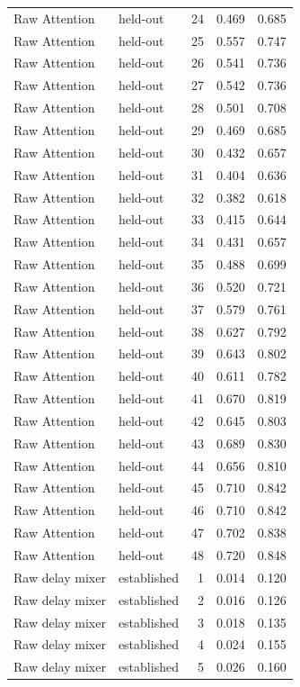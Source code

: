 \begin{tabular}{llrrr}
Raw Attention & held-out & 24 & 0.469 & 0.685 \\
Raw Attention & held-out & 25 & 0.557 & 0.747 \\
Raw Attention & held-out & 26 & 0.541 & 0.736 \\
Raw Attention & held-out & 27 & 0.542 & 0.736 \\
Raw Attention & held-out & 28 & 0.501 & 0.708 \\
Raw Attention & held-out & 29 & 0.469 & 0.685 \\
Raw Attention & held-out & 30 & 0.432 & 0.657 \\
Raw Attention & held-out & 31 & 0.404 & 0.636 \\
Raw Attention & held-out & 32 & 0.382 & 0.618 \\
Raw Attention & held-out & 33 & 0.415 & 0.644 \\
Raw Attention & held-out & 34 & 0.431 & 0.657 \\
Raw Attention & held-out & 35 & 0.488 & 0.699 \\
Raw Attention & held-out & 36 & 0.520 & 0.721 \\
Raw Attention & held-out & 37 & 0.579 & 0.761 \\
Raw Attention & held-out & 38 & 0.627 & 0.792 \\
Raw Attention & held-out & 39 & 0.643 & 0.802 \\
Raw Attention & held-out & 40 & 0.611 & 0.782 \\
Raw Attention & held-out & 41 & 0.670 & 0.819 \\
Raw Attention & held-out & 42 & 0.645 & 0.803 \\
Raw Attention & held-out & 43 & 0.689 & 0.830 \\
Raw Attention & held-out & 44 & 0.656 & 0.810 \\
Raw Attention & held-out & 45 & 0.710 & 0.842 \\
Raw Attention & held-out & 46 & 0.710 & 0.842 \\
Raw Attention & held-out & 47 & 0.702 & 0.838 \\
Raw Attention & held-out & 48 & 0.720 & 0.848 \\
Raw delay mixer & established & 1 & 0.014 & 0.120 \\
Raw delay mixer & established & 2 & 0.016 & 0.126 \\
Raw delay mixer & established & 3 & 0.018 & 0.135 \\
Raw delay mixer & established & 4 & 0.024 & 0.155 \\
Raw delay mixer & established & 5 & 0.026 & 0.160 \\

\end{tabular}
